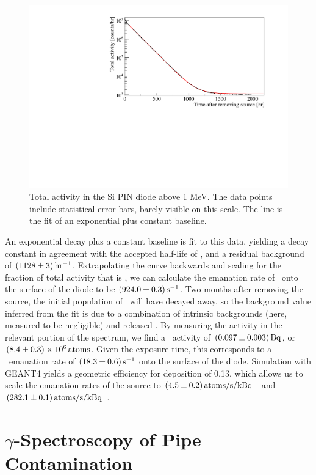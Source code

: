 \begin{figure}[htb]
\centering
\includegraphics[trim = 5 5 55 20, clip = true,width = 0.8\columnwidth]{figures/chapter_five/opensourceactivity.pdf}
\caption{Total activity in the Si PIN diode above 1 MeV. The data points include statistical error bars, barely visible on this scale. The line is the fit of an exponential plus constant baseline.}
\label{fig:pindiodespectrum}
\end{figure}

An exponential decay plus a constant baseline is fit to this data, yielding a decay constant in agreement with the accepted half-life of \Ra, and a residual background of $(1128\pm3)\, \mathrm{hr^{-1}}$. Extrapolating the curve backwards and scaling for the fraction of total activity that is \Ra, we can calculate the emanation rate of \Ra~onto the surface of the diode to be $(924.0\pm0.3)\, \mathrm{s^{-1}}$. Two months after removing the source, the initial population of \Ra~will have decayed away, so the background value inferred from the fit is due to a combination of intrinsic backgrounds (here, measured to be negligible) and released \Th. By measuring the activity in the relevant portion of the spectrum, we find a \Th~activity of $(0.097\pm0.003)\, \mathrm{Bq}$, or $(8.4\pm0.3)\times10^6\, \mathrm{atoms}$. Given the exposure time, this corresponds to a \Th~emanation rate of $(18.3\pm0.6)\, \mathrm{s^{-1}}$ onto the surface of the diode. Simulation with GEANT4 yields a geometric efficiency for deposition of 0.13, which allows us to scale the emanation rates of the source to $(4.5\pm0.2)\, \mathrm{atoms/s/kBq}$ \Th~and $(282.1\pm0.1)\, \mathrm{atoms/s/kBq}$ \Ra.

\section{$\gamma$-Spectroscopy of Pipe Contamination}
\label{sec:flush}

